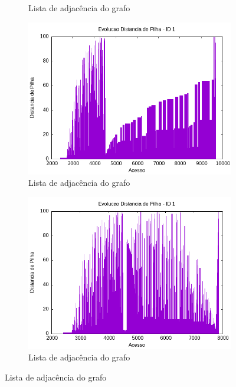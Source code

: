 \documentclass{article}
\begin{document}
\begin{figure}[H]
\begin{subfigure}[c]{0.4\textwidth}
        \caption{Lista de adjacência do grafo}
        \label{fig:ac06}
    \end{subfigure}
    \hfill
    \begin{subfigure}[c]{0.4\textwidth}
        \centering
        \includegraphics[width=\textwidth]{./images/100-200/inserctionsort/registro_a-distp-1.png}
        \caption{Lista de adjacência do grafo}
        \label{fig:ac07}
    \end{subfigure}
    \hfill
    \begin{subfigure}[c]{0.4\textwidth}
        \centering
        \includegraphics[width=\textwidth]{./images/100-200/heapsort/registro_a-distp-1.png}
        \caption{Lista de adjacência do grafo}
        \label{fig:ac08}

\end{subfigure}
\end{figure}
\end{document}
